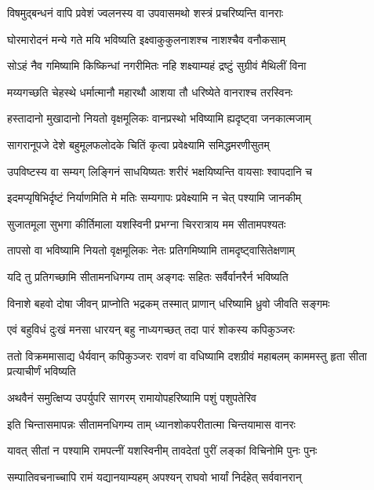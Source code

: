 \twolineshloka
{विषमुद्बन्धनं वापि प्रवेशं ज्वलनस्य वा}
{उपवासमथो शस्त्रं प्रचरिष्यन्ति वानराः} %

\twolineshloka
{घोरमारोदनं मन्ये गते मयि भविष्यति}
{इक्ष्वाकुकुलनाशश्च नाशश्चैव वनौकसाम्} %

\twolineshloka
{सोऽहं नैव गमिष्यामि किष्किन्धां नगरीमितः}
{नहि शक्ष्याम्यहं द्रष्टुं सुग्रीवं मैथिलीं विना} %

\twolineshloka
{मय्यगच्छति चेहस्थे धर्मात्मानौ महारथौ}
{आशया तौ धरिष्येते वानराश्च तरस्विनः} %

\twolineshloka
{हस्तादानो मुखादानो नियतो वृक्षमूलिकः}
{वानप्रस्थो भविष्यामि ह्यदृष्ट्वा जनकात्मजाम्} %

\twolineshloka
{सागरानूपजे देशे बहुमूलफलोदके}
{चितिं कृत्वा प्रवेक्ष्यामि समिद्धमरणीसुतम्} %

\twolineshloka
{उपविष्टस्य वा सम्यग् लिङ्गिनं साधयिष्यतः}
{शरीरं भक्षयिष्यन्ति वायसाः श्वापदानि च} %

\twolineshloka
{इदमप्यृषिभिर्दृष्टं निर्याणमिति मे मतिः}
{सम्यगापः प्रवेक्ष्यामि न चेत् पश्यामि जानकीम्} %

\twolineshloka
{सुजातमूला सुभगा कीर्तिमाला यशस्विनी}
{प्रभग्ना चिररात्राय मम सीतामपश्यतः} %

\twolineshloka
{तापसो वा भविष्यामि नियतो वृक्षमूलिकः}
{नेतः प्रतिगमिष्यामि तामदृष्ट्वासितेक्षणाम्} %

\twolineshloka
{यदि तु प्रतिगच्छामि सीतामनधिगम्य ताम्}
{अङ्गदः सहितः सर्वैर्वानरैर्न भविष्यति} %

\twolineshloka
{विनाशे बहवो दोषा जीवन् प्राप्नोति भद्रकम्}
{तस्मात् प्राणान् धरिष्यामि ध्रुवो जीवति सङ्गमः} %

\twolineshloka
{एवं बहुविधं दुःखं मनसा धारयन् बहु}
{नाध्यगच्छत् तदा पारं शोकस्य कपिकुञ्जरः} %

\threelineshloka
{ततो विक्रममासाद्य धैर्यवान् कपिकुञ्जरः}
{रावणं वा वधिष्यामि दशग्रीवं महाबलम्}
{काममस्तु हृता सीता प्रत्याचीर्णं भविष्यति} %

\twolineshloka
{अथवैनं समुत्क्षिप्य उपर्युपरि सागरम्}
{रामायोपहरिष्यामि पशुं पशुपतेरिव} %

\twolineshloka
{इति चिन्तासमापन्नः सीतामनधिगम्य ताम्}
{ध्यानशोकपरीतात्मा चिन्तयामास वानरः} %

\twolineshloka
{यावत् सीतां न पश्यामि रामपत्नीं यशस्विनीम्}
{तावदेतां पुरीं लङ्कां विचिनोमि पुनः पुनः} %

\twolineshloka
{सम्पातिवचनाच्चापि रामं यद्यानयाम्यहम्}
{अपश्यन् राघवो भार्यां निर्दहेत् सर्ववानरान्} %


